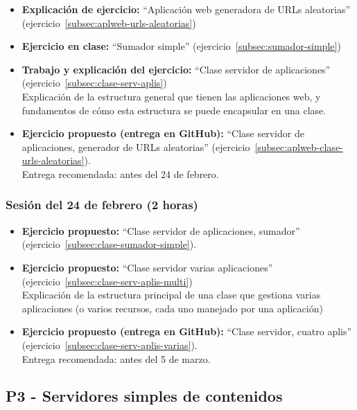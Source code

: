 \documentclass[a4paper,12pt]{article}
\begin{document}
\begin{itemize}
\item \textbf{Explicación de ejercicio:} ``Aplicación web generadora de URLs aleatorias'' (ejercicio~\ref{subsec:aplweb-urls-aleatorias})
\item \textbf{Ejercicio en clase:} ``Sumador simple'' (ejercicio~\ref{subsec:sumador-simple}) \\
\item \textbf{Trabajo y explicación del ejercicio:} ``Clase servidor de aplicaciones'' (ejercicio~\ref{subsec:clase-serv-aplis}) \\
  Explicación de la estructura general que tienen las aplicaciones web, y fundamentos de cómo esta estructura se puede encapsular en una clase.
\item \textbf{Ejercicio propuesto (entrega en GitHub):} ``Clase servidor de aplicaciones, generador de URLs aleatorias'' (ejercicio~\ref{subsec:aplweb-clase-urls-aleatorias}). \\
  Entrega recomendada: antes del 24 de febrero.
\end{itemize}

\subsubsection{Sesión del 24 de febrero (2 horas)}

\begin{itemize}
\item \textbf{Ejercicio propuesto:} ``Clase servidor de aplicaciones, sumador'' (ejercicio~\ref{subsec:clase-sumador-simple}). 
\item \textbf{Ejercicio propuesto:}  ``Clase servidor varias aplicaciones'' (ejercicio~\ref{subsec:clase-serv-aplis-multi}) \\
  Explicación de la estructura principal de una clase que gestiona varias aplicaciones (o varios recursos, cada uno manejado por una aplicación)
\item \textbf{Ejercicio propuesto (entrega en GitHub):} ``Clase servidor, cuatro aplis'' (ejercicio~\ref{subsec:clase-serv-aplis-varias}). \\
  Entrega recomendada: antes del 5 de marzo.
\end{itemize}


\subsection{P3 - Servidores simples de contenidos}
\end{document}
